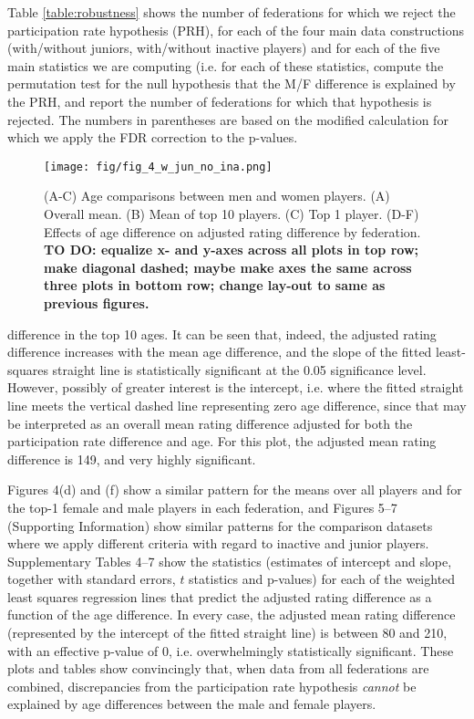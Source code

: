 Table \ref{table:robustness} shows the number of federations for which we reject the participation rate hypothesis (PRH), for each of the four main data constructions (with/without juniors, with/without inactive players) and for each of the five main statistics we are computing (i.e. for each of these statistics, compute the permutation test for the null hypothesis that the M/F difference is explained by the PRH, and report the number of federations for which that hypothesis is rejected. The numbers in parentheses are based on the modified calculation for which we apply the FDR correction to the p-values. 



\begin{figure*}
    \centering
\texttt{[image: fig/fig\_4\_w\_jun\_no\_ina.png]}
    \caption{(A-C) Age comparisons between men and women players. (A) Overall mean. (B) Mean of top 10 players. (C) Top 1 player. (D-F) Effects of age difference on adjusted rating difference by federation. {\bf TO DO: equalize x- and y-axes across all plots in top row; make diagonal dashed; maybe make axes the same across three plots in bottom row; change lay-out to same as previous figures.}}
    \label{fig:mean}
\end{figure*}

difference in the top 10 ages.
It can be seen that, indeed, the adjusted rating difference increases with the mean age difference, and the slope of the fitted least-squares 
straight line is statistically significant at the 0.05 significance level. However, possibly of greater interest is the intercept, i.e. where the
fitted straight line meets the vertical dashed line representing zero age difference, since that may be interpreted as an overall
mean rating difference adjusted for both the participation rate difference and age. For this plot, the adjusted mean rating difference is
149, and very highly significant. 

Figures 4(d) and (f) show a similar pattern for the means over all players and for the top-1 female and male players in each federation, and Figures 5--7 (Supporting Information) show similar patterns for the comparison datasets where we apply different criteria with regard to inactive and junior
players. Supplementary Tables 4--7 show the statistics (estimates of intercept and slope, together with standard errors, $t$ statistics
and p-values) for each of the weighted least squares regression lines that predict the adjusted rating difference as a function of the age difference. In every case, the adjusted mean rating difference (represented by the intercept of the fitted straight line) is between 80 and 210, with an effective
p-value of 0, i.e. overwhelmingly statistically significant.
These plots and tables show convincingly that, when data from all federations are combined, discrepancies from the participation rate
hypothesis \textit{cannot} be explained by age differences between the male and female players.

